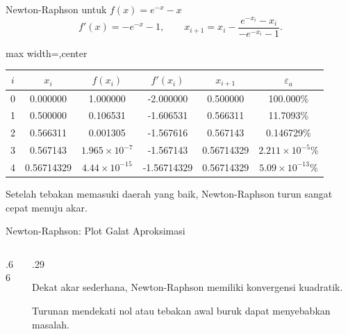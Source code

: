 \documentclass[aspectratio=169,10pt]{beamer}
\begin{document}
\begin{frame}{Newton-Raphson untuk $f(x)=e^{-x}-x$}
\tiny
\[
f'(x)=-e^{-x}-1,\qquad x_{i+1}=x_i-\frac{e^{-x_i}-x_i}{-e^{-x_i}-1}.
\]
\renewcommand{\arraystretch}{1.08}
\begin{adjustbox}{max width=\linewidth,center}
\begin{tabular}{c c c c c c}
\toprule
$i$ & $x_i$ & $f(x_i)$ & $f'(x_i)$ & $x_{i+1}$ & $\varepsilon_a$\\
\midrule
0 & 0.000000 & 1.000000 & -2.000000 & 0.500000 & 100.000\%\\
1 & 0.500000 & 0.106531 & -1.606531 & 0.566311 & 11.7093\%\\
2 & 0.566311 & 0.001305 & -1.567616 & 0.567143 & 0.146729\%\\
3 & 0.567143 & $1.965\times10^{-7}$ & -1.567143 & 0.56714329 & $2.211\times10^{-5}$\%\\
4 & 0.56714329 & $4.44\times10^{-15}$ & -1.56714329 & 0.56714329 & $5.09\times10^{-13}$\%\\
\bottomrule
\end{tabular}
\end{adjustbox}
\begin{greenbox}[Konvergensi]
Setelah tebakan memasuki daerah yang baik, Newton-Raphson turun sangat cepat menuju akar.
\end{greenbox}
\end{frame}

\begin{frame}{Newton-Raphson: Plot Galat Aproksimasi}
\small
\begin{columns}[T,totalwidth=\textwidth]
\begin{column}{.66\textwidth}
\end{column}
\begin{column}{.29\textwidth}
\begin{purplebox}[Cepat]
Dekat akar sederhana, Newton-Raphson memiliki konvergensi kuadratik.
\end{purplebox}
\begin{orangebox}[Risiko]
Turunan mendekati nol atau tebakan awal buruk dapat menyebabkan masalah.
\end{orangebox}
\end{column}
\end{columns}
\end{frame}
\end{document}
